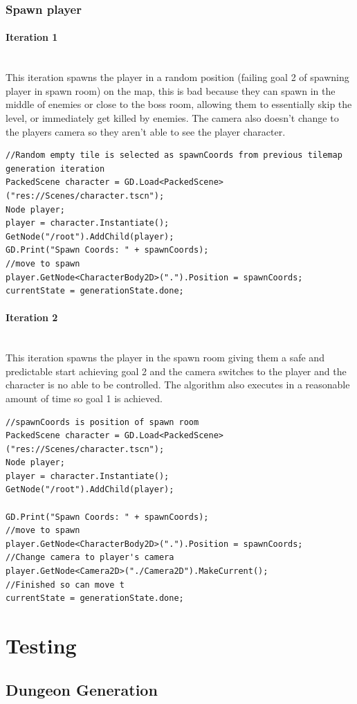 \documentclass{article}
\newcommand{\myparagraph}[1]{\paragraph{#1}\mbox{}\\} %
\begin{document}
\subsubsection{Spawn player}
\myparagraph{Iteration 1}
This iteration spawns the player in a  random position (failing goal 2 of spawning player in spawn room) on the map, this is bad because they can spawn in the middle of enemies or close to the boss room, allowing them to essentially skip the level, or immediately get killed by enemies. The camera also doesn't change to the players camera so they aren't able to see the player character.
\begin{lstlisting}
//Random empty tile is selected as spawnCoords from previous tilemap generation iteration
PackedScene character = GD.Load<PackedScene>("res://Scenes/character.tscn");
Node player;
player = character.Instantiate();
GetNode("/root").AddChild(player);
GD.Print("Spawn Coords: " + spawnCoords);
//move to spawn
player.GetNode<CharacterBody2D>(".").Position = spawnCoords;
currentState = generationState.done;
\end{lstlisting}

\myparagraph{Iteration 2}
This iteration spawns the player in the spawn room giving them a safe and predictable start achieving goal 2 and the camera switches to the player and the character is no able to be controlled. The algorithm also executes in a reasonable amount of time so goal 1 is achieved.
\begin{lstlisting}
//spawnCoords is position of spawn room
PackedScene character = GD.Load<PackedScene>("res://Scenes/character.tscn");
Node player;
player = character.Instantiate();
GetNode("/root").AddChild(player);

GD.Print("Spawn Coords: " + spawnCoords);
//move to spawn
player.GetNode<CharacterBody2D>(".").Position = spawnCoords;
//Change camera to player's camera
player.GetNode<Camera2D>("./Camera2D").MakeCurrent();
//Finished so can move t
currentState = generationState.done;
\end{lstlisting}

\section{Testing}

\subsection{Dungeon Generation}
\end{document}
